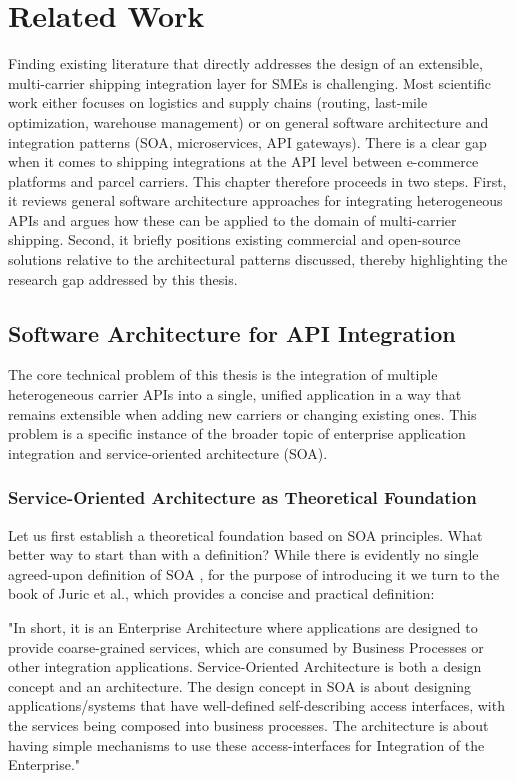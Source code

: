 \documentclass{imc-inf}
\begin{document}
\chapter{Related Work}
\label{ch:related}
Finding existing literature that directly addresses the design of an extensible, multi-carrier shipping integration layer for SMEs is challenging. Most scientific work either focuses on logistics and supply chains (routing, last-mile optimization, warehouse management) or on general software architecture and integration patterns (SOA, microservices, API gateways). There is a clear gap when it comes to shipping integrations at the API level between e-commerce platforms and parcel carriers.
This chapter therefore proceeds in two steps. First, it reviews general software architecture approaches for integrating heterogeneous APIs and argues how these can be applied to the domain of multi-carrier shipping. Second, it briefly positions existing commercial and open-source solutions relative to the architectural patterns discussed, thereby highlighting the research gap addressed by this thesis.

\section{Software Architecture for API Integration}

The core technical problem of this thesis is the integration of multiple heterogeneous carrier APIs into a single, unified application in a way that remains extensible when adding new carriers or changing existing ones.
This problem is a specific instance of the broader topic of enterprise application integration and service-oriented architecture (SOA).

\subsection{Service-Oriented Architecture as Theoretical Foundation}

Let us first establish a theoretical foundation based on SOA principles. What better way to start than with a definition?
While there is evidently no single agreed-upon definition of SOA \cite{niknejadUnderstandingServiceOrientedArchitecture2020}, for the purpose of introducing it we turn to the book of Juric et al., which provides a concise and practical definition:

\begin{displayquote}
  "In short, it is an Enterprise Architecture where applications are designed to provide coarse-grained services, which are consumed by Business Processes or other integration applications.
  Service-Oriented Architecture is both a design concept and an architecture.
  The design concept in SOA is about designing applications/systems that have well-defined self-describing access interfaces, with the services being composed into business processes.
  The architecture is about having simple mechanisms to use these access-interfaces for Integration of the Enterprise." \cite{juricSOAApproachIntegration2007}
\end{displayquote}
\end{document}
